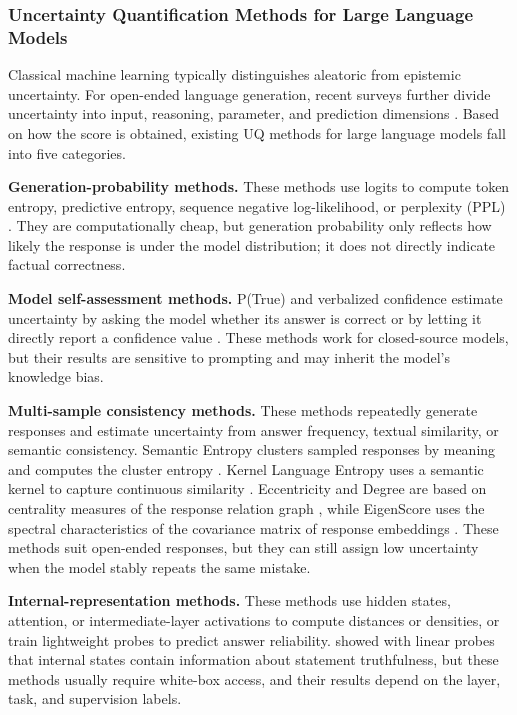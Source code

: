 \subsubsection{Uncertainty Quantification Methods for Large Language Models}

Classical machine learning typically distinguishes aleatoric from epistemic uncertainty. For open-ended language generation, recent surveys further divide uncertainty into input, reasoning, parameter, and prediction dimensions \citep{liu2025uncertainty}. Based on how the score is obtained, existing UQ methods for large language models fall into five categories.

\textbf{Generation-probability methods.} These methods use logits to compute token entropy, predictive entropy, sequence negative log-likelihood, or perplexity (PPL) \citep{malinin2021uncertainty}. They are computationally cheap, but generation probability only reflects how likely the response is under the model distribution; it does not directly indicate factual correctness.

\textbf{Model self-assessment methods.} P(True) and verbalized confidence estimate uncertainty by asking the model whether its answer is correct or by letting it directly report a confidence value \citep{kadavath2022language}. These methods work for closed-source models, but their results are sensitive to prompting and may inherit the model's knowledge bias.

\textbf{Multi-sample consistency methods.} These methods repeatedly generate responses and estimate uncertainty from answer frequency, textual similarity, or semantic consistency. Semantic Entropy clusters sampled responses by meaning and computes the cluster entropy \citep{kuhn2023semantic}. Kernel Language Entropy uses a semantic kernel to capture continuous similarity \citep{nikitin2024kernel}. Eccentricity and Degree are based on centrality measures of the response relation graph \citep{lin2023generating}, while EigenScore uses the spectral characteristics of the covariance matrix of response embeddings \citep{chen2024inside}. These methods suit open-ended responses, but they can still assign low uncertainty when the model stably repeats the same mistake.

\textbf{Internal-representation methods.} These methods use hidden states, attention, or intermediate-layer activations to compute distances or densities, or train lightweight probes to predict answer reliability. \citet{azaria2023internal} showed with linear probes that internal states contain information about statement truthfulness, but these methods usually require white-box access, and their results depend on the layer, task, and supervision labels.

